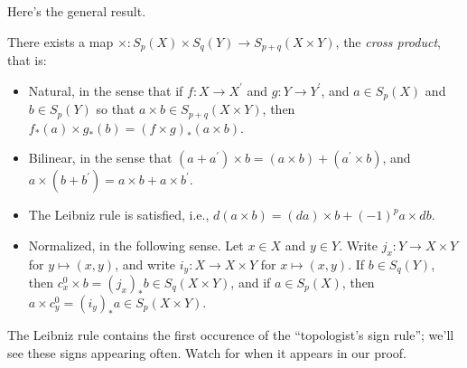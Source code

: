 Here's the general result. 
\begin{theorem}
There exists a map $\times:S_p(X)\times S_q(Y)\to S_{p+q}(X\times Y)$, 
the {\em cross product}, that is:
	\begin{itemize}
	\item Natural, in the sense that if $f:X\to X^\prime$ and $g:Y\to Y^\prime$, and $a\in S_p(X)$ and $b\in S_p(Y)$ so that $a\times b\in S_{p+q}(X\times Y)$, then $f_\ast(a)\times g_\ast(b)=(f\times g)_\ast(a\times b)$.
	\item Bilinear, in the sense that $(a+a^\prime)\times b=(a\times b)+(a^\prime\times b)$, and $a\times (b+b^\prime)=a\times b+a\times b^\prime$.
	\item The Leibniz rule is satisfied, i.e., $d(a\times b)=(da)\times b + (-1)^pa\times db$.
	\item Normalized, in the following sense. Let $x\in X$ and $y\in Y$. Write $j_x:Y\to X\times Y$ for $y\mapsto (x,y)$, and write $i_y:X\to X\times Y$ 
for $x\mapsto (x,y)$. If $b\in S_q(Y)$, then $c^0_x\times b=(j_x)_\ast b\in S_q(X\times Y)$, and if $a\in S_p(X)$, then $a\times c^0_y=(i_y)_\ast a\in S_p(X\times Y)$.
	\end{itemize}
\end{theorem}
The Leibniz rule contains the first occurence of the 
``topologist's sign rule'';
we'll see these signs appearing often. Watch for when it appears in our proof.

